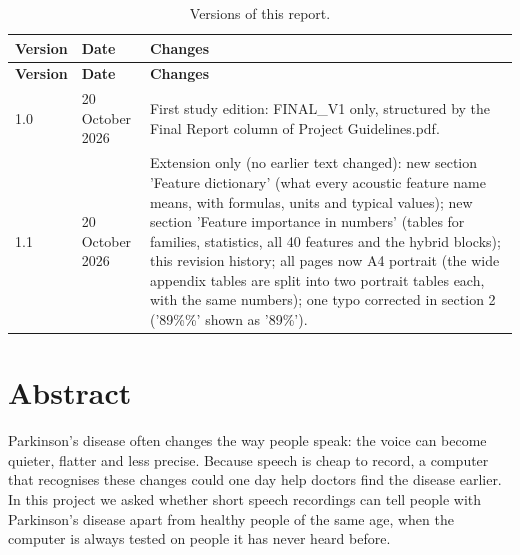 \documentclass[11pt,a4paper]{article}
\begin{document}
\begin{center}\small\renewcommand{\arraystretch}{1.15}
\begin{longtable}{>{\raggedright\arraybackslash}p{1.56cm}>{\raggedright\arraybackslash}p{2.74cm}>{\raggedright\arraybackslash}p{10.94cm}}
\caption{Versions of this report.}\\
\toprule
\textbf{\hspace{0pt}Version} & \textbf{\hspace{0pt}Date} & \textbf{\hspace{0pt}Changes}\\\midrule\endfirsthead
\toprule
\textbf{\hspace{0pt}Version} & \textbf{\hspace{0pt}Date} & \textbf{\hspace{0pt}Changes}\\\midrule\endhead
\bottomrule\endfoot
\hspace{0pt}1.0 & \hspace{0pt}20 October 2026 & \hspace{0pt}First study edition: FINAL\_\allowbreak{}V1 only, structured by the Final Report column of Project Guidelines.pdf.\\
\hspace{0pt}1.1 & \hspace{0pt}20 October 2026 & \hspace{0pt}Extension only (no earlier text changed): new section 'Feature dictionary' (what every acoustic feature name means, with formulas, units and typical values); new section 'Feature importance in numbers' (tables for families, statistics, all 40 features and the hybrid blocks); this revision history; all pages now A4 portrait (the wide appendix tables are split into two portrait tables each, with the same numbers); one typo corrected in section 2 ('89\%\%' shown as '89\%').\\
\end{longtable}\end{center}
\section{Abstract}\label{sec:abstract}
Parkinson's disease often changes the way people speak: the voice can become quieter, flatter and less precise. Because speech is cheap to record, a computer that recognises these changes could one day help doctors find the disease earlier. In this project we asked whether short speech recordings can tell people with Parkinson's disease apart from healthy people of the same age, when the computer is always tested on people it has never heard before.
\end{document}
